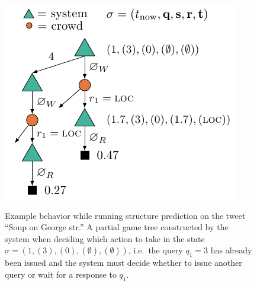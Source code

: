 \begin{figure}
  \centering
      \includegraphics[width=\textwidth,height=0.33\textheight,keepaspectratio]{figures/mcts_simple.pdf}\\[1.7ex]
      \caption[Game tree.]{\label{fig:otj:tree}
      Example behavior while running structure prediction on the tweet ``Soup on George str.''
      A partial game tree constructed by the system when deciding which action to take in the state $\sigma = (1, (3), (0), (\emptyset), (\emptyset))$, i.e.\ the query $q_1 = 3$ has already been issued and the system must decide whether to issue another query or wait for a response to $q_1$.
      }
\end{figure}




